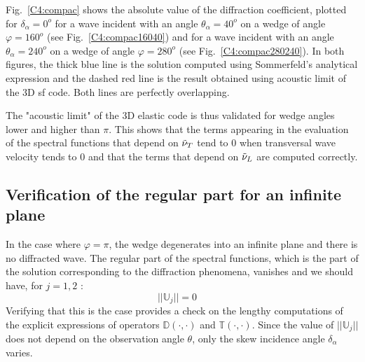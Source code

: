 Fig.~\ref{C4:compac} shows the absolute value of the diffraction coefficient, plotted for $\delta_{\alpha}=0^o$ for a wave incident with an angle $\theta_{\alpha}=40^o$ on a wedge of angle $\varphi=160^o$ (see Fig.~\ref{C4:compac16040}) and for a wave incident with an angle $\theta_{\alpha}=240^o$ on a wedge of angle $\varphi=280^o$ (see Fig.~\ref{C4:compac280240}). In both figures, the thick blue line is the solution computed using Sommerfeld's analytical expression and the dashed red line is the result obtained using acoustic limit of the 3D \acrshort{sf} code. Both lines are perfectly overlapping.

The "acoustic limit" of the 3D elastic code is thus validated for wedge angles lower and higher than $\pi$. This shows that the terms appearing in the evaluation of the spectral functions that depend on $\tilde{\nu}_T$ tend to $0$ when transversal wave velocity tends to $0$ and that the terms that depend on $\tilde{\nu}_L$ are computed correctly. 

\subsection{Verification of the regular part for an infinite plane}
In the case where $\varphi=\pi$, the wedge degenerates into an infinite plane and there is no diffracted wave. The regular part of the spectral functions, which is the part of the solution corresponding to the diffraction phenomena, vanishes and we should have, for $j=1,2$ :
\begin{equation}
||\mathbb{U}_j||=0 \hspace{1em} %
\end{equation}
Verifying that this is the case provides a check on the lengthy computations of the explicit expressions of operators $\mathbb{D}(\cdot,\cdot)$ and $\mathbb{T}(\cdot,\cdot)$. Since the value of $||\mathbb{U}_j||$ does not depend on the observation angle $\theta$, only the skew incidence angle $\delta_{\alpha}$ varies.


